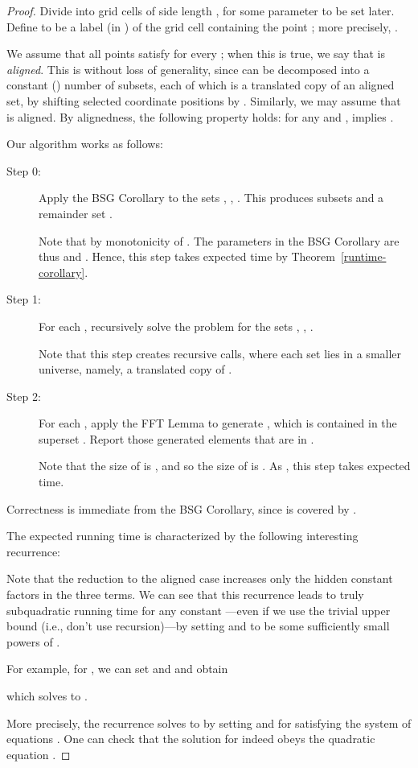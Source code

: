 \documentclass[11pt]{article}
\begin{document}
\begin{proof}
Divide  into 
grid cells of side length , for some parameter  to be set later.
Define  to be a label (in ) of the grid cell
containing the point ; more precisely,
.

We assume that all points 
satisfy  for every ;
when this is true, we say
that  is \emph{aligned}.  This is without loss of generality,
since  can be decomposed into a constant () number of subsets, each of which is a translated copy of an aligned set,
by shifting selected coordinate positions by .
Similarly, we may assume that  is aligned.
By alignedness, the following property holds: for any  and
,  implies .

Our algorithm works as follows:
\begin{description}
\item[Step 0:]
Apply the BSG Corollary to the sets ,
, .
This produces subsets  and a remainder set .

Note that  by monotonicity of .
The parameters in the BSG Corollary are thus 
and .
Hence, this step takes  expected time
by Theorem~\ref{runtime-corollary}.
\item[Step 1:]
For each ,
recursively solve the problem for the sets
, ,
.

Note that
this step creates  recursive calls,
where each set lies in a smaller universe, namely,
a translated copy of .
\item[Step 2:]
For each ,
apply the FFT Lemma to generate
,
which is contained in the
superset .
Report those generated elements that are in .

Note that the size of  is ,
and so the size of  is .
As , this step takes
 expected time.
\end{description}

Correctness is immediate from the BSG Corollary, since
 is covered by
.

The expected running time is characterized by the following interesting recurrence:

Note that the reduction to the aligned case increases only
the hidden constant factors in the three terms.
We can see that this recurrence leads to truly subquadratic
running time for any constant ---even if we use the trivial upper bound 
(i.e., don't use recursion)---by setting  and  to be some sufficiently small powers of .

For example, for , we can set  and  and obtain

which solves to .

More precisely, the recurrence solves to 
by setting  and  for  satisfying
the system of equations
.  One can check that the
solution for  indeed obeys the quadratic equation
.


\end{proof}
\end{document}
